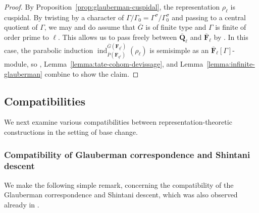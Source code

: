 \documentclass[reqno]{amsart}
\numberwithin{equation}{subsection}
\newcommand{\F}{\mathbf{F}}
\newcommand{\Q}{\mathbf{Q}}
\newcommand{\ol}[1]{\overline{#1}}
\DeclareMathOperator{\ind}{ind}
\theoremstyle{remark}
\numberwithin{equation}{subsection}
\numberwithin{figure}{subsection}
\begin{document}
\begin{proof}
    By Proposition~\ref{prop:glauberman-cuspidal}, the representation $\rho_\ell$ is cuspidal. By twisting by a character of $\Gamma/\Gamma_0 = \Gamma^\sigma/\Gamma_0^\sigma$ and passing to a central quotient of $\Gamma$, we may and do assume that $\ol G$ is of finite type and $\Gamma$ is finite of order prime to $\ell$. This allows us to pass freely between $\ol\Q_\ell$ and $\ol\F_\ell$ by \cite[Part~III, no.\ 15.5, Proposition~43]{Serre77}. In this case, the parabolic induction $\ind_{\ol P(\F_{q^\ell})}^{\ol G(\F_{q^\ell})}(\rho_\ell)$ is semisimple as an $\ol\F_\ell[\Gamma]$-module, so \cite[Proposition~3.3]{TV}, Lemma~\ref{lemma:tate-cohom-devissage}, and Lemma~\ref{lemma:infinite-glauberman} combine to show the claim.
\end{proof}



\subsection{Compatibilities}

We next examine various compatibilities between representation-theoretic constructions in the setting of base change. 

\subsubsection{Compatibility of Glauberman correspondence and Shintani descent} We make the following simple remark, concerning the compatibility of the Glauberman correspondence and Shintani descent, which was also observed already in \cite{Dig86b}.
\end{document}
